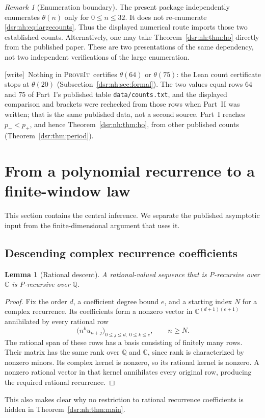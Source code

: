 \documentclass[11pt,a4paper]{article}
\numberwithin{equation}{section}
\newtheorem{lemma}[theorem]{Lemma}
\theoremstyle{definition}
\theoremstyle{remark}
\newtheorem{remark}[theorem]{Remark}
\newcommand{\repo}{\textsc{ProveIt}}
\newcommand{\wtag}{\textup{[write]}}
\newcommand{\lean}[1]{\nolinkurl{#1}}
\newcommand{\C}{\mathbb C}
\newcommand{\Q}{\mathbb Q}
\newcommand{\tht}{\theta}
\theoremstyle{definition}
\theoremstyle{plain}
\begin{document}
\begin{remark}[Enumeration boundary]
The present package independently enumerates $\tht(n)$ only for $0\le n\le32$.
It does not re-enumerate \eqref{dsr:nh:eq:largecounts}. Thus the displayed numerical
route imports those two established counts. Alternatively, one may take
Theorem~\ref{dsr:nh:thm:ho} directly from the published paper. These are two
presentations of the same dependency, not two independent verifications of
the large enumeration.
\end{remark}
\wtag\ Nothing in \repo\ certifies $\tht(64)$ or $\tht(75)$: the Lean
count certificate stops at $\tht(20)$ (Subsection~\ref{dsr:nh:sec:formal}).
The two values equal rows $64$ and $75$ of Part~I's published table
\lean{data/counts.txt}, and the displayed comparison and brackets were
rechecked from those rows when Part~II was written; that is the same
published data, not a second source. Part~I reaches $p_-<p_+$, and hence
Theorem~\ref{dsr:nh:thm:ho}, from other published counts
(Theorem~\ref{dsr:thm:period}).

\section{From a polynomial recurrence to a finite-window law}
\label{dsr:nh:sec:window}
This section contains the central inference. We separate the published
asymptotic input from the finite-dimensional argument that uses it.

\subsection{Descending complex recurrence coefficients}
\begin{lemma}[Rational descent]
\label{dsr:nh:lem:descent}
A rational-valued sequence that is P-recursive over $\C$ is P-recursive
over $\Q$.
\end{lemma}
\begin{proof}
Fix the order $d$, a coefficient degree bound $e$, and a starting index
$N$ for a complex recurrence. Its coefficients form a nonzero vector
in $\C^{(d+1)(e+1)}$ annihilated by every rational row
\[
\bigl(n^k u_{n+j}\bigr)_{0\le j\le d,\;0\le k\le e},
\qquad n\ge N.
\]
The rational span of these rows has a basis consisting of finitely many
rows. Their matrix has the same rank over $\Q$ and $\C$, since rank is
characterized by nonzero minors. Its complex kernel is nonzero, so its
rational kernel is nonzero. A nonzero rational vector in that kernel
annihilates every original row, producing the required rational recurrence.
\end{proof}
This also makes clear why no restriction to rational recurrence
coefficients is hidden in Theorem~\ref{dsr:nh:thm:main}.
\end{document}
